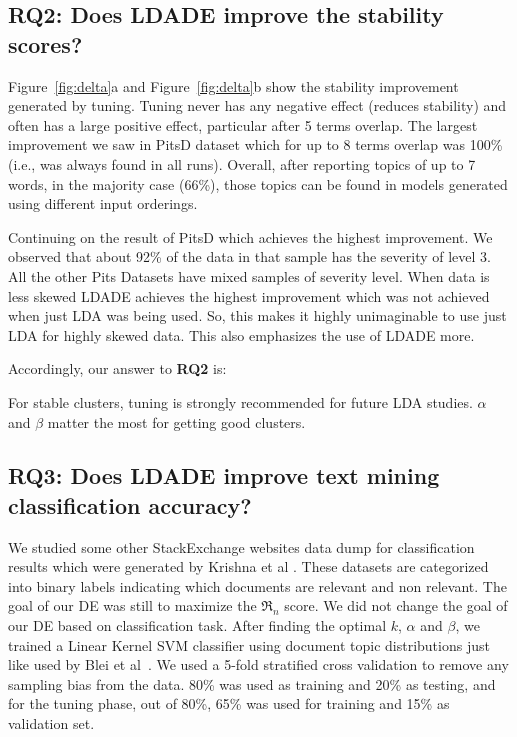 \documentclass[twocolumn,5p,sort&compress]{elsarticle}
\theoremstyle{break}
\begin{document}
\subsection{\textbf{RQ2: Does LDADE improve the stability scores?}}\label{sect:stable}

 Figure~\ref{fig:delta}a and Figure~\ref{fig:delta}b show the stability improvement
 generated by tuning.
   Tuning never
  has any negative effect (reduces stability) and often has a large positive effect,
  particular  after 5 terms overlap.
   The largest improvement  we
   saw  in PitsD dataset which for up to 8 terms overlap was 100\% (i.e., was always
   found in all runs).
   Overall, after reporting topics of up to 7 words, in the majority case (66\%),
  those topics can be found in models generated using different input orderings.
  
  Continuing on the result of PitsD which achieves the highest improvement. We observed that  about 92\% of the data in that sample has the severity of level 3.  All the other Pits Datasets have mixed samples of severity level. When data is less skewed LDADE achieves the highest improvement which was not achieved when just LDA was being used. So, this makes it highly unimaginable to use just LDA for highly skewed data. This also emphasizes the use of LDADE more. 
  
  
  Accordingly, our answer to {\bf RQ2} is:

\begin{lesson}
For stable clusters, tuning is strongly recommended for future LDA studies. $\alpha$ and $\beta$ matter the most for getting good clusters.
\end{lesson}

\subsection{\textbf{RQ3: Does LDADE improve text mining classification accuracy?}}\label{sect:rq3} 

We studied some other StackExchange websites data dump for classification results which were generated by Krishna et al \cite{krishna2016bigse}. These datasets are categorized into binary labels indicating which documents are relevant and non relevant. The goal of our DE was still to maximize the $\Re_n$ score. We did not change the goal of our DE based on classification task. After finding the optimal $k$, $\alpha$ and $\beta$, we trained a Linear Kernel SVM classifier using document topic distributions just like used by Blei et al~\cite{blei2003latent}. We used a 5-fold stratified cross validation to remove any sampling bias from the data. 80\% was used as training and 20\% as testing, and for the tuning phase, out of 80\%, 65\% was used for training and 15\% as validation set.
\end{document}
